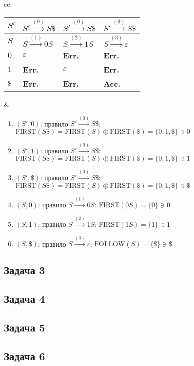 \documentclass[a4paper]{article}
\def\first{\mathrm{ FIRST} }
\def\follow{\mathrm{ FOLLOW} }
\begin{document}
\begin{enumerate}
\begin{tabular}{cc}
\begin{minipage}{0.29\textwidth}
\begin{tabular}{|l|l|l|l|}
$S'$ & $S'\overset{(0)}{\to}S\$$ & $S'\overset{(0)}{\to}S\$$ & $S'\overset{(0)}{\to}S\$$ \\\hline
$S$ & $S\overset{(1)}{\to}0S$ & $S\overset{(2)}{\to}1S$ & $S\overset{(3)}{\to}\varepsilon$ \\\hline
$0$ & $\varepsilon$ & {\bf Err.} & {\bf Err.}\\\hline
$1$ & {\bf Err.} & $\varepsilon$ & {\bf Err.}\\\hline
$\$$ & {\bf Err.} & {\bf Err.} & {\bf Acc.} \\\hline
\end{tabular}
\end{minipage} &
\begin{minipage}{0.7\textwidth}
\begin{enumerate}
\item $(S',0)$: правило $S'\overset{(0)}{\to}S\$$: $\first(S\$)=\first(S)\oplus\first(\$)=\{0,1,\$\}\ni 0$
\item $(S',1)$: правило $S'\overset{(0)}{\to}S\$$: $\first(S\$)=\first(S)\oplus\first(\$)=\{0,1,\$\}\ni 1$
\item $(S',\$)$: правило $S'\overset{(0)}{\to}S\$$: $\first(S\$)=\first(S)\oplus\first(\$)=\{0,1,\$\}\ni \$$
\item $(S,0)$: правило $S\overset{(1)}{\to}0S$: $\first(0S)=\{0\}\ni 0$
\item $(S,1)$: правило $S\overset{(2)}{\to}1S$: $\first(1S)=\{1\}\ni 1$
\item $(S,\$)$: правило $S\overset{(3)}{\to}\varepsilon$: $\follow(S)=\{\$\}\ni \$$
\end{enumerate}
\end{minipage}
\end{tabular}
\end{enumerate}
\subsection*{Задача 3}
\subsection*{Задача 4}
\subsection*{Задача 5}
\subsection*{Задача 6}
\end{document}
